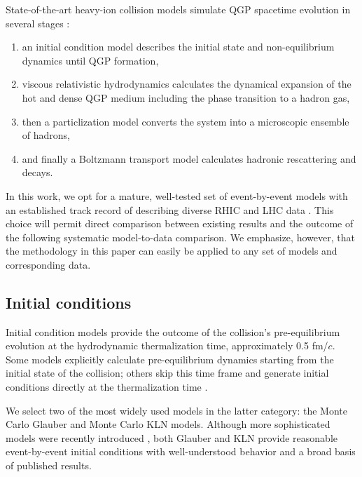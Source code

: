 \documentclass[aps,prc,reprint,superscriptaddress,amsmath]{revtex4-1}
\begin{document}
State-of-the-art heavy-ion collision models simulate QGP spacetime evolution in several stages \cite{Bass:2000ib,Teaney:2001av,Hirano:2005xf,Nonaka:2006yn,Petersen:2008dd,Song:2010mg,Schenke:2010rr,Shen:2014vra}:
\begin{enumerate}
  \item an initial condition model describes the initial state and non-equilibrium dynamics until QGP formation,
  \item viscous relativistic hydrodynamics calculates the dynamical expansion of the hot and dense QGP medium including the phase transition to a hadron gas,
  \item then a particlization model converts the system into a microscopic ensemble of hadrons,
  \item and finally a Boltzmann transport model calculates hadronic rescattering and decays.
\end{enumerate}
In this work, we opt for a mature, well-tested set of event-by-event models \cite{Shen:2014vra} with an established track record of describing diverse RHIC and LHC data \cite{Song:2010mg,Shen:2011zc,Song:2011hk}.
This choice will permit direct comparison between existing results and the outcome of the following systematic model-to-data comparison.
We emphasize, however, that the methodology in this paper can easily be applied to any set of models and corresponding data.

\subsection{Initial conditions}

Initial condition models provide the outcome of the collision's pre-equilibrium evolution at the hydrodynamic thermalization time, approximately 0.5 fm/$c$.
Some models explicitly calculate pre-equilibrium dynamics \cite{Schenke:2012wb} starting from the initial state of the collision; others skip this time frame and generate initial conditions directly at the thermalization time \cite{Drescher:2006pi,Miller:2007ri,Moreland:2014oya}.

We select two of the most widely used models in the latter category:
the Monte Carlo Glauber \cite{Miller:2007ri} and Monte Carlo KLN \cite{Drescher:2006pi} models.
Although more sophisticated models were recently introduced \cite{Schenke:2012wb,Moreland:2014oya}, both Glauber and KLN provide reasonable event-by-event initial conditions with well-understood behavior and a broad basis of published results.
\end{document}
